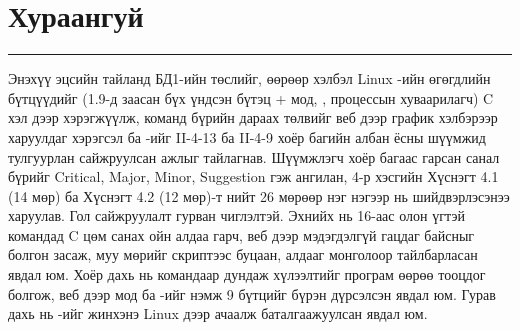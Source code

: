 

\renewcommand{\kdsLTfont}{\fontsize{8.5}{10.5}\selectfont}
\linespread{1.1}
\setlength{\parskip}{5pt plus 1pt}
\renewcommand{\arraystretch}{1.02}
\renewcommand{\hthree}[1]{%
  \par\Needspace{6\baselineskip}\addvspace{8pt}%
  {\fontsize{12.5}{15}\selectfont\bfseries #1\par}\nopagebreak[4]%
  \addvspace{2pt}%
}




\tableofcontents
\thispagestyle{fancy}
\vspace{2mm}

\section*{Хураангуй}
\noindent\rule{\textwidth}{1.2pt}\par\vspace{6pt}

Энэхүү эцсийн тайланд БД1-ийн төслийг, өөрөөр хэлбэл Linux -ийн өгөгдлийн бүтцүүдийг (1.9-д заасан бүх үндсэн бүтэц +  мод, , процессын хуваарилагч) C хэл дээр хэрэгжүүлж, команд бүрийн дараах төлвийг веб дээр график хэлбэрээр харуулдаг  хэрэгсэл ба -ийг II-4-13 ба II-4-9 хоёр багийн албан ёсны шүүмжид тулгуурлан сайжруулсан ажлыг тайлагнав. Шүүмжлэгч хоёр багаас гарсан санал бүрийг Critical, Major, Minor, Suggestion гэж ангилан, 4-р хэсгийн Хүснэгт 4.1 (14 мөр) ба Хүснэгт 4.2 (12 мөр)-т нийт 26 мөрөөр нэг нэгээр нь шийдвэрлэсэнээ харуулав. Гол сайжруулалт гурван чиглэлтэй. Эхнийх нь 16-аас олон үгтэй командад C цөм санах ойн алдаа гарч, веб дээр мэдэгдэлгүй гацдаг байсныг  болгон засаж, муу мөрийг скриптээс буцаан, алдааг монголоор тайлбарласан явдал юм. Хоёр дахь нь  командаар дундаж хүлээлтийг програм өөрөө тооцдог болгож, веб дээр  мод ба -ийг нэмж 9 бүтцийг бүрэн дүрсэлсэн явдал юм. Гурав дахь нь -ийг жинхэнэ Linux дээр ачаалж баталгаажуулсан явдал юм.

